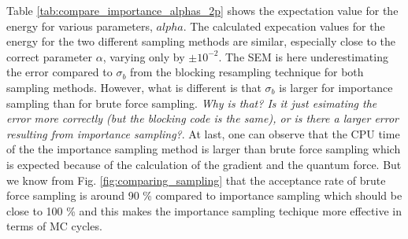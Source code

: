 Table \ref{tab:compare_importance_alphas_2p} shows the expectation value for the energy for various parameters, $alpha$.  The calculated expecation values for the energy for the two different sampling methods are similar, especially close to the correct parameter $\alpha$, varying only by $\pm 10^{-2}$. The SEM is here underestimating the error compared to $\sigma_b$ from the blocking resampling technique for both sampling methods. However, what is different is that $\sigma_b$ is larger for importance sampling than for brute force sampling. \textit{Why is that? Is it just esimating the error more correctly (but the blocking code is the same), or is there a larger error resulting from importance sampling?}. At last, one can observe that the CPU time of the the importance sampling method is larger than brute force sampling which is expected because of the calculation of the gradient and the quantum force. But we know from Fig. \ref{fig:comparing_sampling} that the acceptance rate of brute force sampling is around 90 \% compared to importance sampling which should be close to 100 \% and this makes the importance sampling techique more effective in terms of MC cycles.

